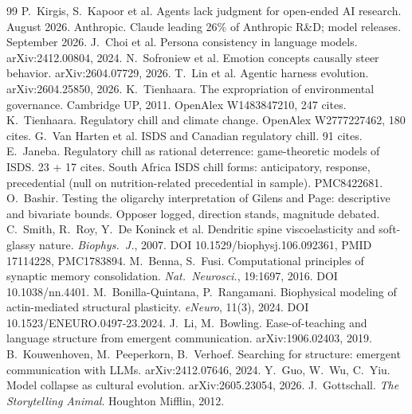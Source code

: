 \documentclass[11pt,openany]{book}
\begin{document}
\begin{thebibliography}{99}
 P.\ Kirgis, S.\ Kapoor et al. Agents lack judgment for open-ended AI research. August 2026.
 Anthropic. Claude leading 26\% of Anthropic R\&D; model releases. September 2026.
 J.\ Choi et al. Persona consistency in language models. arXiv:2412.00804, 2024.
 N.\ Sofroniew et al. Emotion concepts causally steer behavior. arXiv:2604.07729, 2026.
 T.\ Lin et al. Agentic harness evolution. arXiv:2604.25850, 2026.
 K.\ Tienhaara. The expropriation of environmental governance. Cambridge UP, 2011. OpenAlex W1483847210, 247 cites.
 K.\ Tienhaara. Regulatory chill and climate change. OpenAlex W2777227462, 180 cites.
 G.\ Van Harten et al. ISDS and Canadian regulatory chill. 91 cites.
 E.\ Janeba. Regulatory chill as rational deterrence: game-theoretic models of ISDS. 23 + 17 cites.
 South Africa ISDS chill forms: anticipatory, response, precedential (null on nutrition-related precedential in sample). PMC8422681.
 O.\ Bashir. Testing the oligarchy interpretation of Gilens and Page: descriptive and bivariate bounds. Opposer logged, direction stands, magnitude debated.
 C.\ Smith, R.\ Roy, Y.\ De Koninck et al. Dendritic spine viscoelasticity and soft-glassy nature. \textit{Biophys.\ J.}, 2007. DOI 10.1529/biophysj.106.092361, PMID 17114228, PMC1783894.
 M.\ Benna, S.\ Fusi. Computational principles of synaptic memory consolidation. \textit{Nat.\ Neurosci.}, 19:1697, 2016. DOI 10.1038/nn.4401.
 M.\ Bonilla-Quintana, P.\ Rangamani. Biophysical modeling of actin-mediated structural plasticity. \textit{eNeuro}, 11(3), 2024. DOI 10.1523/ENEURO.0497-23.2024.
 J.\ Li, M.\ Bowling. Ease-of-teaching and language structure from emergent communication. arXiv:1906.02403, 2019.
 B.\ Kouwenhoven, M.\ Peeperkorn, B.\ Verhoef. Searching for structure: emergent communication with LLMs. arXiv:2412.07646, 2024.
 Y.\ Guo, W.\ Wu, C.\ Yiu. Model collapse as cultural evolution. arXiv:2605.23054, 2026.
 J.\ Gottschall. \textit{The Storytelling Animal}. Houghton Mifflin, 2012.

\end{thebibliography}
\end{document}
